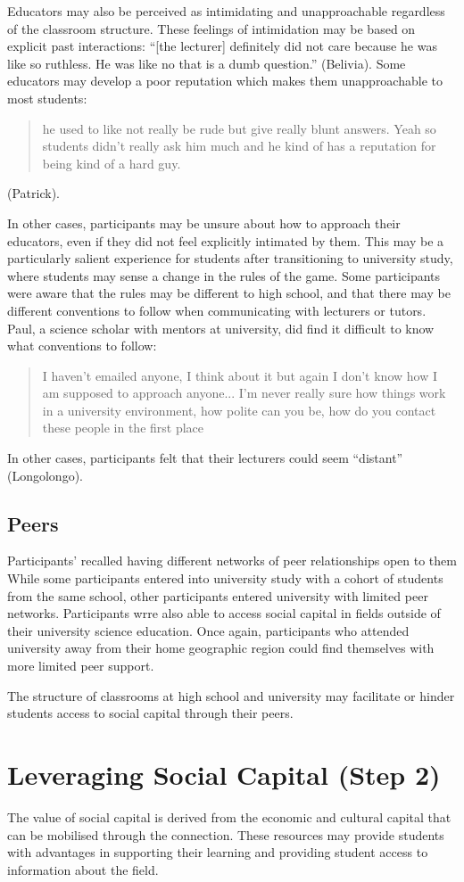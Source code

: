 Educators may also be perceived as intimidating and unapproachable regardless of the classroom structure. These feelings of intimidation may be based on explicit past interactions: ``[the lecturer] definitely did not care because he was like so ruthless. He was like no that is a dumb question.'' (Belivia). Some educators may develop a poor reputation which makes them unapproachable to most students: \blockquote{he used to like not really be rude but give really blunt answers. Yeah so students didn't really ask him much and he kind of has a reputation for being kind of a hard guy.} (Patrick).

In other cases, participants may be unsure about how to approach their educators, even if they did not feel explicitly intimated by them. This may be a particularly salient experience for students after transitioning to university study, where students may sense a change in the rules of the game. Some participants were aware that the rules may be different to high school, and that there may be different conventions to follow when communicating with lecturers or tutors. Paul, a science scholar with mentors at university, did find it difficult to know what conventions to follow:
\blockquote{I haven't emailed anyone, I think about it but again I don't know how I am supposed to approach anyone... I'm never really sure how things work in a university environment, how polite can you be, how do you contact these people in the first place}. In other cases, participants felt that their lecturers could seem ``distant'' (Longolongo).  




\subsection{Peers}
Participants' recalled having different networks of peer relationships open to them While some participants entered into university study with a cohort of students from the same school, other participants entered university with limited peer networks. Participants wrre also able to access social capital in fields outside of their university science education. Once again, participants who attended university away from their home geographic region could find themselves with more limited peer support. 

The structure of classrooms at high school and university may facilitate or hinder students access to social capital through their peers. 


\section{Leveraging Social Capital (Step 2)}
The value of social capital is derived from the economic and cultural capital that can be mobilised through the connection. These resources may provide students with advantages in supporting their learning and providing student access to information about the field. 

